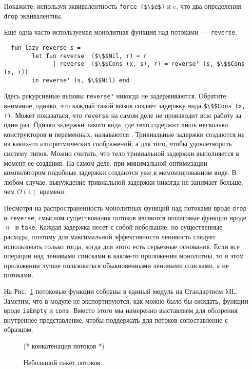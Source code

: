 \begin{exercise}\label{ex:4.1}
  Покажите, используя эквивалентность \lstinline!force ($\$e$)! и $e$,
  что два определения \lstinline!drop! эквивалентны.
\end{exercise}

Ещё одна часто используемая монолитная функция над потоками~---
\lstinline!reverse!.
\begin{lstlisting}
  fun lazy reverse s =
        let fun reverse' ($\$$Nil, r) = r
              | reverse' ($\$$Cons (x, s), r) = reverse' (s, $\$$Cons (x, r))
        in reverse' (s, $\$$Nil) end
\end{lstlisting}
Здесь рекурсивные вызовы \lstinline!reverse'! никогда не
задерживаются. Обратите внимание, однако, что каждый такой вызов
создает задержку вида \lstinline!$\$$Cons (x, r)!. Может показаться,
что \lstinline!reverse! на самом деле не производит всю работу за один
раз. Однако задержки такого вида, где тело содержит лишь
несколько конструкторов и переменных, называются
. Тривиальные задержки создаются не из
каких-то алгоритмических соображений, а для того, чтобы удовлетворить
систему типов. Можно считать, что тело тривиальной задержки
выполняется в момент ее создания.  На самом деле, при минимальной
оптимизации компилятором подобные задержки создаются уже в
мемоизированном виде. В любом случае, вынуждение тривиальной
задержки никогда не занимает больше, чем $O(1)$ времени.

Несмотря на распространенность монолитных функций над потоками вроде
\lstinline!drop! и \lstinline!reverse!, смыслом существования потоков
являются пошаговые функции вроде $+\!\!\!+\,$ и \lstinline!take!. Каждая
задержка несет с собой небольшие, но существенные расходы, поэтому для
максимальной эффективности ленивость следует использовать только тогда,
когда для этого есть серьезные основания. Если все операции над
ленивыми списками в каком-то приложении монолитны, то в этом
приложении лучше пользоваться обыкновенными ленивыми списками, а не
потоками.

На Рис.~\ref{fig:4.1} потоковые функции собраны в единый модуль на
Стандартном ML. Заметим, что в модуле не экспортируются, как можно
было бы ожидать,  функции вроде \lstinline!isEmpty! и
\lstinline!cons!. Вместо этого мы намеренно выставляем для обозрения
внутреннее представление, чтобы поддержать для потоков сопоставление с
образцом.

\begin{figure}
  \centering

  (* конкатенация потоков *)

  \caption{Небольшой пакет потоков.}
  \label{fig:4.1}
\end{figure}

